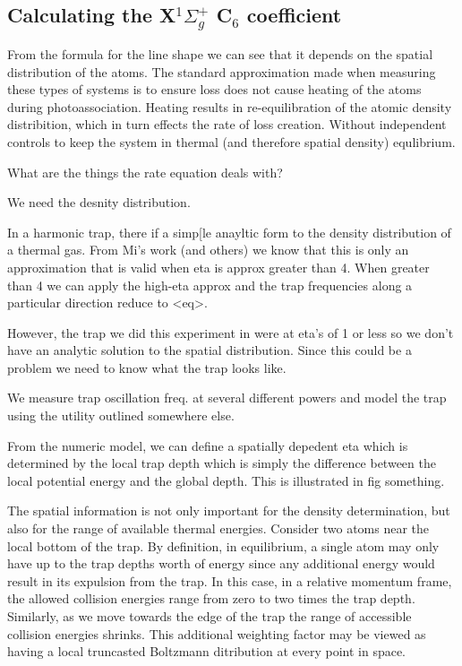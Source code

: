 \subsection{Calculating the X$^1\Sigma_g^+$ C$_6$ coefficient} \label{sec:c6calc}




From the formula for the line shape we can see that it depends on the spatial distribution of the atoms. The standard approximation made when measuring these types of systems is to ensure loss does not cause heating of the atoms during photoassociation. 
Heating results in re-equilibration of the atomic density distribition, which in turn effects the rate of loss creation. 
Without independent controls to keep the system in thermal (and therefore spatial density) equlibrium.

What are the things the rate equation deals with?

We need the desnity distribution.

In a harmonic trap, there if a simp[le anayltic form to the density distribution of a thermal gas. 
From Mi's work (and others) we know that this is only an approximation that is valid when eta is approx greater than 4. 
When greater than 4 we can apply the high-eta approx and the trap frequencies along a particular direction reduce to <eq>.

However, the trap we did this experiment in were at eta's of 1 or less so we don't have an analytic solution to the spatial distribution.
Since this could be a problem we need to know what the trap looks like.

We measure trap oscillation freq. at several different powers and model the trap using the utility outlined somewhere else.

From the numeric model, we can define a spatially depedent eta which is determined by the local trap depth which is simply the difference between the local potential energy and the global depth.
This is illustrated in fig something.

The spatial information is not only important for the density determination, but also for the range of available thermal energies.
Consider two atoms near the local bottom of the trap. By definition, in equilibrium, a single atom may only have up to the trap depths worth of energy since any additional energy would result in its expulsion from the trap.
In this case, in a relative momentum frame, the allowed collision energies range from zero to two times the trap depth.
Similarly, as we move towards the edge of the trap the range of accessible collision energies shrinks.
This additional weighting factor may be viewed as having a local truncasted Boltzmann ditribution at every point in space. 

